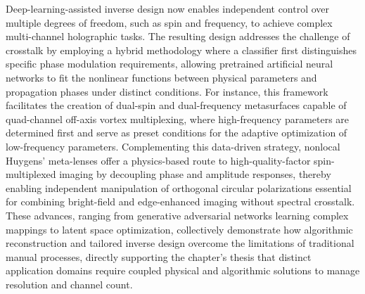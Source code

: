 Deep-learning-assisted inverse design now enables independent control over multiple degrees of freedom, such as spin and frequency, to achieve complex multi-channel holographic tasks. The resulting design addresses the challenge of crosstalk by employing a hybrid methodology where a classifier first distinguishes specific phase modulation requirements, allowing pretrained artificial neural networks to fit the nonlinear functions between physical parameters and propagation phases under distinct conditions. For instance, this framework facilitates the creation of dual-spin and dual-frequency metasurfaces capable of quad-channel off-axis vortex multiplexing, where high-frequency parameters are determined first and serve as preset conditions for the adaptive optimization of low-frequency parameters. Complementing this data-driven strategy, nonlocal Huygens' meta-lenses offer a physics-based route to high-quality-factor spin-multiplexed imaging by decoupling phase and amplitude responses, thereby enabling independent manipulation of orthogonal circular polarizations essential for combining bright-field and edge-enhanced imaging without spectral crosstalk. These advances, ranging from generative adversarial networks learning complex mappings to latent space optimization, collectively demonstrate how algorithmic reconstruction and tailored inverse design overcome the limitations of traditional manual processes, directly supporting the chapter's thesis that distinct application domains require coupled physical and algorithmic solutions to manage resolution and channel count. \citep{doi_10_1117_1_apn_2_1_016010_57069347} \citep{doi_10_1038_s41377_024_01728_3_7dbdfab0} \citep{doi_10_3390_photonics12100947_b44bdefd}


